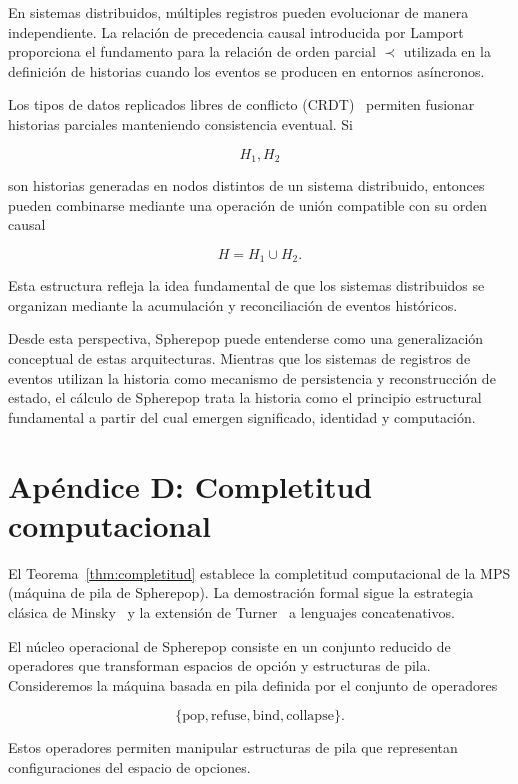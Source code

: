 \documentclass[12pt]{article}
\theoremstyle{plain}
\theoremstyle{definition}
\begin{document}
En sistemas distribuidos, múltiples registros pueden evolucionar de manera independiente. La relación de precedencia causal introducida por Lamport~\cite{lamport} proporciona el fundamento para la relación de orden parcial $\prec$ utilizada en la definición de historias cuando los eventos se producen en entornos asíncronos.

Los tipos de datos replicados libres de conflicto (CRDT)~\cite{shapiro} permiten fusionar historias parciales manteniendo consistencia eventual. Si

\[
H_1, H_2
\]

son historias generadas en nodos distintos de un sistema distribuido, entonces pueden combinarse mediante una operación de unión compatible con su orden causal

\[
H = H_1 \cup H_2 .
\]

Esta estructura refleja la idea fundamental de que los sistemas distribuidos se organizan mediante la acumulación y reconciliación de eventos históricos.

Desde esta perspectiva, Spherepop puede entenderse como una generalización conceptual de estas arquitecturas. Mientras que los sistemas de registros de eventos utilizan la historia como mecanismo de persistencia y reconstrucción de estado, el cálculo de Spherepop trata la historia como el principio estructural fundamental a partir del cual emergen significado, identidad y computación.

\section{Apéndice D: Completitud computacional}
\label{ap:completitud}

El Teorema~\ref{thm:completitud} establece la completitud computacional de la MPS (máquina de pila de Spherepop). La demostración formal sigue la estrategia clásica de Minsky~\cite{minsky} y la extensión de Turner~\cite{turner} a lenguajes concatenativos.

El núcleo operacional de Spherepop consiste en un conjunto reducido de operadores que transforman espacios de opción y estructuras de pila. Consideremos la máquina basada en pila definida por el conjunto de operadores

\[
\{ \mathrm{pop}, \mathrm{refuse}, \mathrm{bind}, \mathrm{collapse} \}.
\]

Estos operadores permiten manipular estructuras de pila que representan configuraciones del espacio de opciones.
\end{document}
